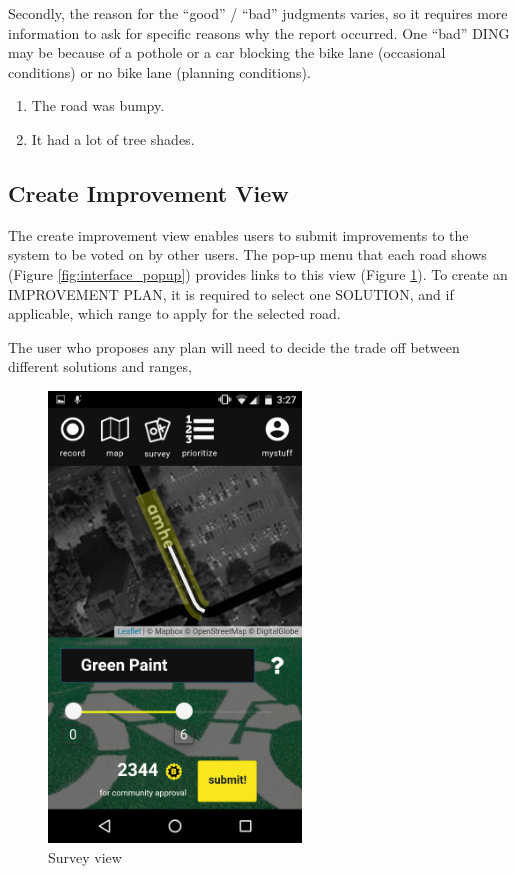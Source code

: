Secondly, the reason for the ``good'' / ``bad'' judgments varies, so it requires more information to
ask for specific reasons why the report occurred. One ``bad'' DING may be because of a pothole or a
car blocking the bike lane (occasional conditions) or no bike lane (planning conditions).

\begin{enumerate}
  \item The road was bumpy.
  \item It had a lot of tree shades.
\end{enumerate}

\subsection{Create Improvement View}

The create improvement view enables users to submit improvements to the system to be voted on by other users.
The pop-up menu that each road shows (Figure \ref{fig:interface_popup}) provides links to this view (Figure \ref{fig:interface_improvment}). 
To create an IMPROVEMENT PLAN, it is required to select one SOLUTION,
and if applicable, which range to apply for the selected road.

The user who proposes any plan will need to decide the trade off between different solutions and ranges, 


\begin{figure}[!htb]
  \includegraphics[width=0.6\textwidth]{chapters/4/fig/interface_solution2.png}               
  \caption[interface: Survey]{Survey view}
  \label{fig:interface_improvment}
\end{figure}

